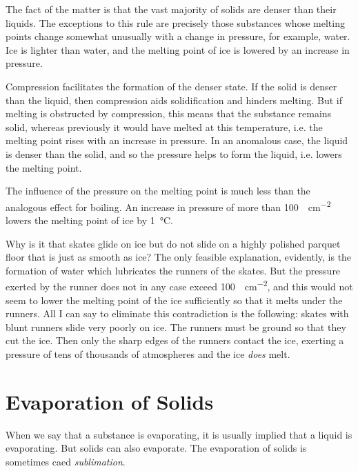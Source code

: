 The fact of the matter is that the vast majority of solids are denser than their liquids. The exceptions to this rule are precisely those substances whose melting points change somewhat unusually with a change in pressure, for example, water. Ice is lighter than water, and the melting point of ice is lowered by an increase in pressure.

Compression facilitates the formation of the denser state. If the solid is denser than the liquid, then compres­sion aids solidification and hinders melting. But if melting is obstructed by compression, this means that the substance remains solid, whereas previously it would have melted at this temperature, i.e. the melting point rises with an increase in pressure. In an anomalous case, the liquid is denser than the solid, and so the pressure helps to form the liquid, i.e. lowers the melting point.

The influence of the pressure on the melting point is much less than the analogous effect for boiling. An increase in pressure of more than \SI{100}{\kgf\per\centi\meter\squared} lowers the melting point of ice by \SI{1}{\celsius}.

Why is it that skates glide on ice but do not slide on a highly polished parquet floor that is just as smooth as ice? The only feasible explanation, evidently, is the formation of water which lubricates the runners of the skates. But the pressure exerted by the runner does not in any case exceed \SI{100}{\kgf\per\centi\meter\squared}, and this would not seem to lower the melt­ing point of the ice sufficiently so that it melts under the runners. All I can say to eliminate this contradiction is the following: skates with blunt runners slide very poorly on ice. The runners must be ground so that they cut the ice. Then only the sharp edges of the runners contact the ice, exerting a pressure of tens of thousands of atmospheres and the ice \emph{does} melt.

\section{Evaporation of Solids}

When we say that a substance is evaporating, it is usually implied that a liquid is evaporating. But solids can also evaporate. The evaporation of solids is sometimes caed \emph{sublimation}.

